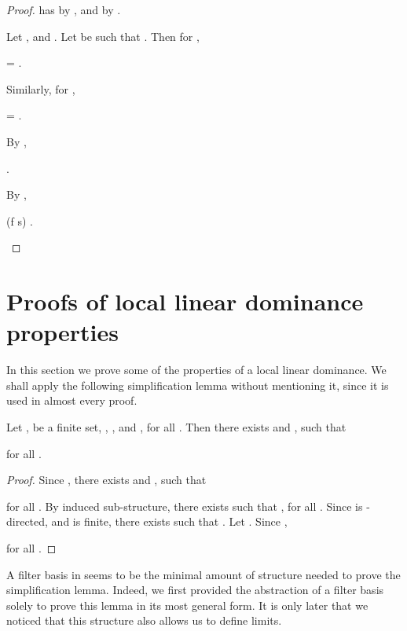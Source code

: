 \documentclass[b5paper, english, oneside]{memoir}
\begin{document}
\begin{proof}
 has  by , and  by . 

Let , and . Let  be such that . Then for ,
\begin{eqs}
 = .
\end{eqs}
Similarly, for ,
\begin{eqs}
 = .
\end{eqs}
By ,
\begin{eqs}
 \subset {}.
\end{eqs}
By ,
\begin{eqs}
(f \circ s) \in {}.
\end{eqs}
\end{proof}

\chapter{Proofs of local linear dominance properties}
\label{ProofsForLocalLinearDominance}

In this section we prove some of the properties of a local linear dominance. We shall apply the following simplification lemma without mentioning it, since it is used in almost every proof.

\begin{lemma}
\label{LocalSingleConstantLemma}
Let ,  be a finite set, , , and , for all . Then there exists  and , such that

for all .
\end{lemma}

\begin{proof}
Since , there exists  and , such that

for all . By induced sub-structure, there exists  such that , for all . Since  is -directed, and  is finite, there exists  such that . Let . Since ,

for all .
\end{proof}

\begin{note}
A filter basis in  seems to be the minimal amount of structure needed to prove the simplification lemma. Indeed, we first provided the abstraction of a filter basis solely to prove this lemma in its most general form. It is only later that we noticed that this structure also allows us to define limits.
\end{note}
\end{document}
